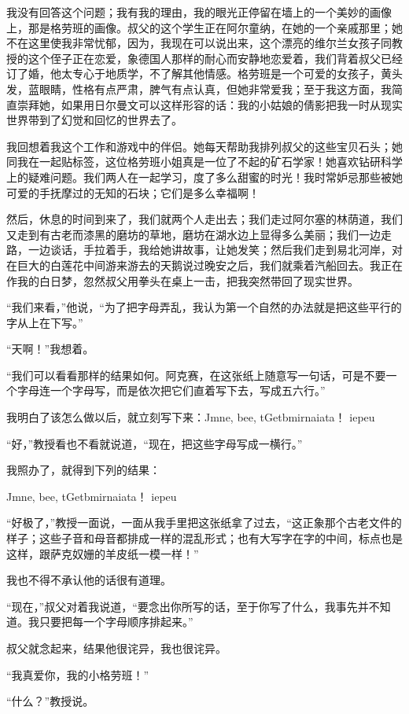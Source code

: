 \documentclass[10pt]{book}
\begin{document}
我没有回答这个问题；我有我的理由，我的眼光正停留在墙上的一个美妙的画像上，那是格劳班的画像。叔父的这个学生正在阿尔童纳，在她的一个亲戚那里；她不在这里使我非常忧郁，因为，我现在可以说出来，这个漂亮的维尔兰女孩子同教授的这个侄子正在恋爱，象德国人那样的耐心而安静地恋爱着，我们背着叔父已经订了婚，他太专心于地质学，不了解其他情感。格劳班是一个可爱的女孩子，黄头发，蓝眼睛，性格有点严肃，脾气有点认真，但她非常爱我；至于我这方面，我简直崇拜她，如果用日尔曼文可以这样形容的话：我的小姑娘的倩影把我一时从现实世界带到了幻觉和回忆的世界去了。

我回想着我这个工作和游戏中的伴侣。她每天帮助我排列叔父的这些宝贝石头；她同我在一起贴标签，这位格劳班小姐真是一位了不起的矿石学家！她喜欢钻研科学上的疑难问题。我们两人在一起学习，度了多么甜蜜的时光！我时常妒忌那些被她可爱的手抚摩过的无知的石块；它们是多么幸福啊！

然后，休息的时间到来了，我们就两个人走出去；我们走过阿尔塞的林荫道，我们又走到有古老而漆黑的磨坊的草地，磨坊在湖水边上显得多么美丽；我们一边走路，一边谈话，手拉着手，我给她讲故事，让她发笑；然后我们走到易北河岸，对在巨大的白莲花中间游来游去的天鹅说过晚安之后，我们就乘着汽船回去。我正在作我的白日梦，忽然叔父用拳头在桌上一击，把我突然带回了现实世界。

“我们来看，”他说，“为了把字母弄乱，我认为第一个自然的办法就是把这些平行的字从上在下写。”

“天啊！”我想着。

“我们可以看看那样的结果如何。阿克赛，在这张纸上随意写一句话，可是不要一个字母连一个字母写，而是依次把它们直着写下去，写成五六行。”

我明白了该怎么做以后，就立刻写下来：Jmne, bee, tGetbmirnaiata！ iepeu

“好，”教授看也不看就说道，“现在，把这些字母写成一横行。”

我照办了，就得到下列的结果：

Jmne, bee, tGetbmirnaiata！ iepeu

“好极了，”教授一面说，一面从我手里把这张纸拿了过去，“这正象那个古老文件的样子；这些子音和母音都排成一样的混乱形式；也有大写字在字的中间，标点也是这样，跟萨克奴姗的羊皮纸一模一样！”

我也不得不承认他的话很有道理。

“现在，”叔父对着我说道，“要念出你所写的话，至于你写了什么，我事先并不知道。我只要把每一个字母顺序排起来。”

叔父就念起来，结果他很诧异，我也很诧异。

“我真爱你，我的小格劳班！”

“什么？”教授说。
\end{document}
